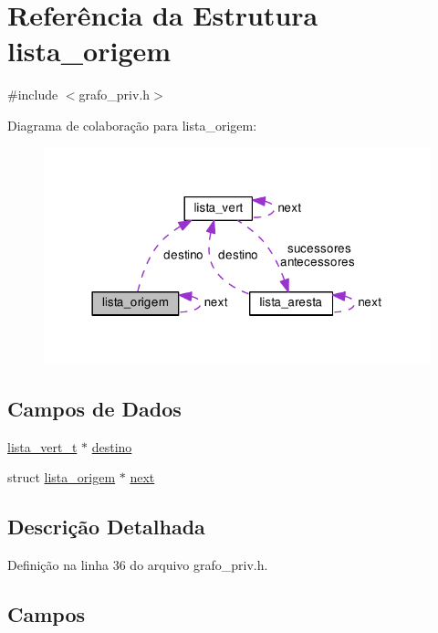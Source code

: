 \hypertarget{structlista__origem}{}\section{Referência da Estrutura lista\+\_\+origem}
\label{structlista__origem}


{\ttfamily \#include $<$grafo\+\_\+priv.\+h$>$}



Diagrama de colaboração para lista\+\_\+origem\+:
\nopagebreak
\begin{figure}[H]
\begin{center}
\leavevmode
\includegraphics[width=318pt]{structlista__origem__coll__graph}
\end{center}
\end{figure}
\subsection*{Campos de Dados}
\begin{DoxyCompactItemize}
\item 
\hyperlink{grafo__priv_8h_aecb68281fecb412bf6427dd6a07d5077}{lista\+\_\+vert\+\_\+t} $\ast$ \hyperlink{structlista__origem_a2634ade77a03658b5cbc02e44d3e784f}{destino}
\item 
struct \hyperlink{structlista__origem}{lista\+\_\+origem} $\ast$ \hyperlink{structlista__origem_a3d90d523832090d0a99ee45025c95c03}{next}
\end{DoxyCompactItemize}


\subsection{Descrição Detalhada}


Definição na linha 36 do arquivo grafo\+\_\+priv.\+h.



\subsection{Campos}
\hypertarget{structlista__origem_a2634ade77a03658b5cbc02e44d3e784f}{}
